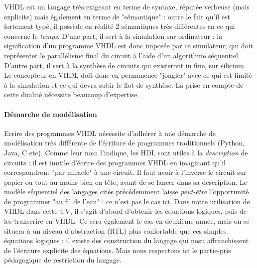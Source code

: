 VHDL est un langage très exigeant en terme de syntaxe, réputée verbeuse (mais explicite) mais également en terme de "sémantique" : outre le fait qu'il est fortement typé, il possède
en réalité 2 sémantiques très différentes en ce qui concerne le {\it temps}. D'une part, il sert à la simulation sur ordinateur : la signification d'un programme VHDL est donc imposée par ce simulateur, qui doit
représenter le parallélisme final du circuit à l'aide d'un algorithme séquentiel. D'autre part, il sert à la synthèse de circuits qui existeront in fine, sur silicium. Le concepteur
en VHDL doit donc en permanence "jongler" avec ce qui est limité à la simulation et ce qui devra subir le flot de synthèse. La prise en compte de cette dualité nécessite beaucoup d'expertise.

\paragraph{Démarche de modélisation}
Ecrire des programmes VHDL nécessite d'adhérer à une démarche de modélisation très différente de l'écriture de programmes traditionnels (Python, Java, C etc). Comme leur nom l'indique,
les HDL sont utiles à la {\it description} de circuits : il est inutile d'écrire des programmes VHDL en imaginant qu'il correspondront "par miracle" à une circuit. Il faut avoir à l'inverse
le circuit sur papier ou tout au moins bien en tête, avant de se lancer dans sa description. Le modèle séquentiel des langages cités précédemment laisse {\it peut-être} l'opportunité de
programmer "au fil de l'eau" : ce n'est pas le cas ici. Dans notre utilisation de VHDL dans cette UV, il s'agit d'abord d'obtenir les équations logiques, puis de les transcrire en VHDL.
Ce sera également le cas en deuxième année, mais on se situera à un niveau d'abstraction (RTL) plus confortable que ces simples équations logiques : il existe des construction du langage
qui nosu affranchissent de l'écriture explicite des équations. Mais nous respectons ici le partie-pris pédagogique de restriction du langage.


